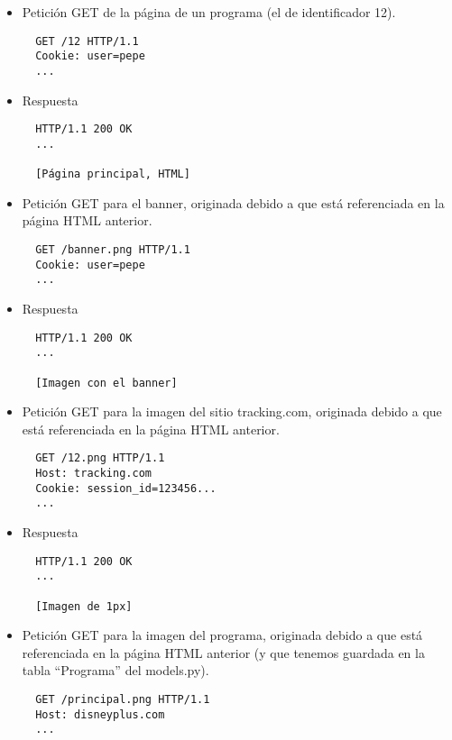 \begin{itemize}

\item Petición GET de la página de un programa (el de identificador 12).

\begin{verbatim}
  GET /12 HTTP/1.1
  Cookie: user=pepe
  ...
\end{verbatim}

\item Respuesta

\begin{verbatim}
  HTTP/1.1 200 OK
  ...

  [Página principal, HTML]
\end{verbatim}


\item Petición GET para el banner, originada debido a que está referenciada en la página HTML anterior.

\begin{verbatim}
  GET /banner.png HTTP/1.1
  Cookie: user=pepe
  ...
\end{verbatim}

\item Respuesta

\begin{verbatim}
  HTTP/1.1 200 OK
  ...

  [Imagen con el banner]
\end{verbatim}

\item Petición GET para la imagen del sitio tracking.com, originada debido a que está referenciada en la página HTML anterior.

\begin{verbatim}
  GET /12.png HTTP/1.1
  Host: tracking.com
  Cookie: session_id=123456...
  ...
\end{verbatim}

\item Respuesta

\begin{verbatim}
  HTTP/1.1 200 OK
  ...

  [Imagen de 1px]
\end{verbatim}

\item Petición GET para la imagen del programa, originada debido a que está referenciada en la página HTML anterior (y que tenemos guardada en la tabla ``Programa'' del models.py).

\begin{verbatim}
  GET /principal.png HTTP/1.1
  Host: disneyplus.com
  ...
\end{verbatim}


\end{itemize}
